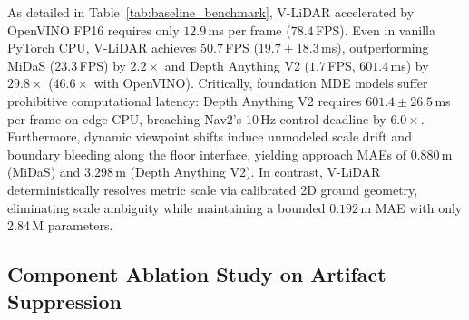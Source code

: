 \documentclass{ieeeaccess}
\begin{document}
\begin{table}[!t]
  \centering
  \footnotesize
  \caption{Quantitative Benchmark: Proposed V-LiDAR vs. Monocular Depth Estimation (MDE) Baselines on Onboard CPU (Intel Core Ultra 7 155H)}
  \label{tab:baseline_benchmark}
\end{table}

As detailed in Table~\ref{tab:baseline_benchmark}, V-LiDAR accelerated by OpenVINO FP16 requires only $12.9$\,ms per frame ($78.4$\,FPS). Even in vanilla PyTorch CPU, V-LiDAR achieves $50.7$\,FPS ($19.7 \pm 18.3$\,ms), outperforming MiDaS ($23.3$\,FPS) by $2.2\times$ and Depth Anything V2 ($1.7$\,FPS, $601.4$\,ms) by $29.8\times$ ($46.6\times$ with OpenVINO). Critically, foundation MDE models suffer prohibitive computational latency: Depth Anything V2 requires $601.4 \pm 26.5$\,ms per frame on edge CPU, breaching Nav2's 10\,Hz control deadline by $6.0\times$. Furthermore, dynamic viewpoint shifts induce unmodeled scale drift and boundary bleeding along the floor interface, yielding approach MAEs of $0.880$\,m (MiDaS) and $3.298$\,m (Depth Anything V2). In contrast, V-LiDAR deterministically resolves metric scale via calibrated 2D ground geometry, eliminating scale ambiguity while maintaining a bounded $0.192$\,m MAE with only 2.84\,M parameters.

\subsection{Component Ablation Study on Artifact Suppression}
\label{subsec:ablation_study}
\end{document}
